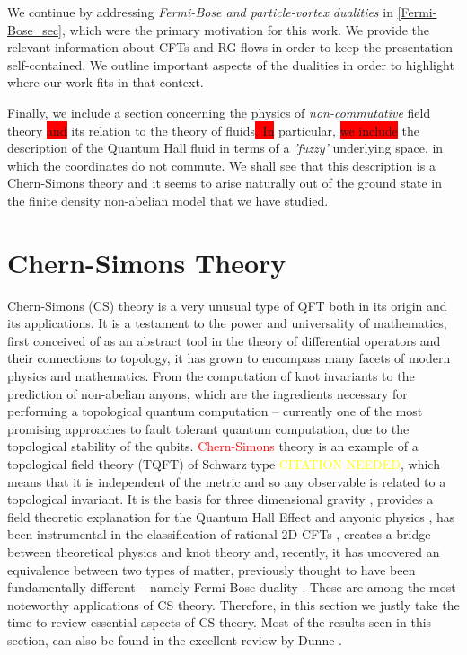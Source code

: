     We continue by addressing \textit{Fermi-Bose and particle-vortex dualities} in \ref{Fermi-Bose_sec}, which were the primary motivation for this work. We provide the relevant information about CFTs and RG flows in order to keep the presentation self-contained. We outline important aspects of the dualities in order to highlight where our work fits in that context.

    Finally, we include a section concerning the physics of \textit{non-commutative} field theory \colorbox{red}{and} its relation to the theory of fluids\colorbox{red}{. In} particular, \colorbox{red}{we include} the description of the Quantum Hall fluid in terms of a \textit{'fuzzy'} underlying space, in which the coordinates do not commute. We shall see that this description is a Chern-Simons theory and it seems to arise naturally out of the ground state in the finite density non-abelian model that we have studied.

        \section{Chern-Simons Theory} \label{CS_sec}
    Chern-Simons (CS) theory is a very unusual type of QFT both in its origin and its applications. It is a testament to the power and universality of mathematics, first conceived of as an abstract tool in the theory of differential operators and their connections to topology, it has grown to encompass many facets of modern physics and mathematics. From the computation of knot invariants to the prediction of non-abelian anyons, which are the ingredients necessary for performing a topological quantum computation -- currently one of the most promising approaches to fault tolerant quantum computation, due to the topological stability of the qubits. \textcolor{red}{Chern-Simons} theory is an example of a topological field theory (TQFT) of Schwarz type \textcolor{yellow}{CITATION NEEDED}, which means that it is independent of the metric and so any observable is related to a topological invariant. It is the basis for three dimensional gravity \cite{gr-qc/0503022}, provides a field theoretic explanation for the Quantum Hall Effect and anyonic physics \cite{cond-mat/9501022, 1606.06687}, has been instrumental in the classification of rational 2D CFTs \cite{Moore1989}, creates a bridge between theoretical physics and knot theory \cite{Witten1989} and, recently, it has uncovered an equivalence between two types of matter, previously thought to have been fundamentally different -- namely Fermi-Bose duality \cite{1512.00161}. These are among the most noteworthy applications of CS theory. Therefore, in this section we justly take the time to review essential aspects of CS theory. Most of the results seen in this section, can also be found in the excellent review by Dunne \cite{hep-th/9902115}.

